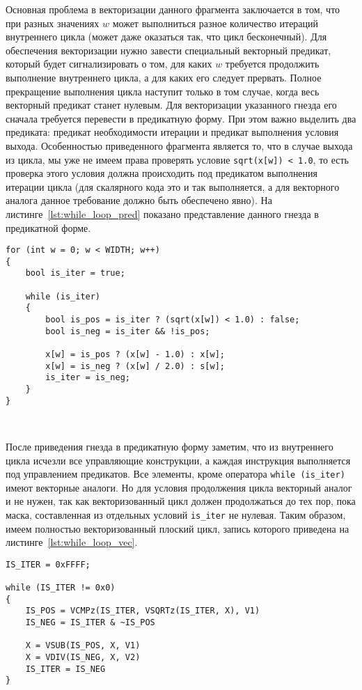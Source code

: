 \documentclass[
11pt,%
tightenlines,%
twoside,%
onecolumn,%
nofloats,%
nobibnotes,%
nofootinbib,%
superscriptaddress,%
noshowpacs,%
centertags]%
{revtex4}
\begin{document}
Основная проблема в векторизации данного фрагмента заключается в том, что при разных значениях $w$ может выполниться разное количество итераций внутреннего цикла (может даже оказаться так, что цикл бесконечный).
Для обеспечения векторизации нужно завести специальный векторный предикат, который будет сигнализировать о том, для каких $w$ требуется продолжить выполнение внутреннего цикла, а для каких его следует прервать.
Полное прекращение выполнения цикла наступит только в том случае, когда весь векторный предикат станет нулевым.
Для векторизации указанного гнезда его сначала требуется перевести в предикатную форму.
При этом важно выделить два предиката: предикат необходимости итерации и предикат выполнения условия выхода.
Особенностью приведенного фрагмента является то, что в случае выхода из цикла, мы уже не имеем права проверять условие \texttt{sqrt(x[w]) < 1.0}, то есть проверка этого условия должна происходить под предикатом выполнения итерации цикла (для скалярного кода это и так выполняется, а для векторного аналога данное требование должно быть обеспечено явно).
На листинге~\ref{lst:while_loop_pred} показано представление данного гнезда в предикатной форме. 

\begin{lstlisting}[caption={Предикатная форма плоского цикла, содержащего цикл с неконстантным числом итераций},label={lst:while_loop_pred}]
for (int w = 0; w < WIDTH; w++)
{
    bool is_iter = true;

    while (is_iter)
    {
        bool is_pos = is_iter ? (sqrt(x[w]) < 1.0) : false;
        bool is_neg = is_iter && !is_pos;    
    
        x[w] = is_pos ? (x[w] - 1.0) : x[w];
        x[w] = is_neg ? (x[w] / 2.0) : s[w];
        is_iter = is_neg;
    }
}
\end{lstlisting}

\

После приведения гнезда в предикатную форму заметим, что из внутреннего цикла исчезли все управляющие конструкции, а каждая инструкция выполняется под управлением предикатов.
Все элементы, кроме оператора \texttt{while (is\_iter)} имеют векторные аналоги.
Но для условия продолжения цикла векторный аналог и не нужен, так как векторизованный цикл должен продолжаться до тех пор, пока маска, составленная из отдельных условий \texttt{is\_iter} не нулевая.
Таким образом, имеем полностью векторизованный плоский цикл, запись которого приведена на листинге~\ref{lst:while_loop_vec}.

\begin{lstlisting}[caption={Векторная форма плоского цикла, содержащего цикл с неконстантным числом итераций},label={lst:while_loop_vec}]
IS_ITER = 0xFFFF;

while (IS_ITER != 0x0)
{
    IS_POS = VCMPz(IS_ITER, VSQRTz(IS_ITER, X), V1)
    IS_NEG = IS_ITER & ~IS_POS
    
    X = VSUB(IS_POS, X, V1)
    X = VDIV(IS_NEG, X, V2)
    IS_ITER = IS_NEG
}
\end{lstlisting}
\end{document}
